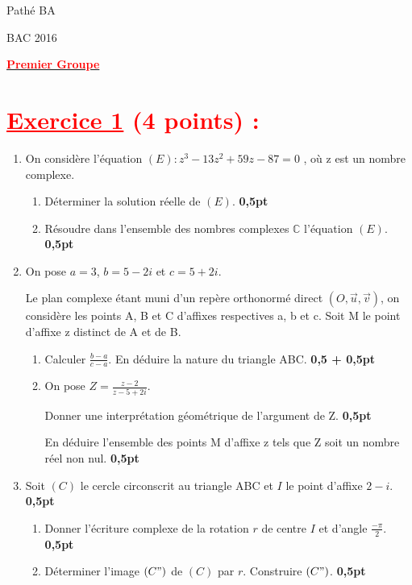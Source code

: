 \documentclass[12pt]{article}
\begin{document}
\begin{minipage}{0.8\textwidth}
	Pathé BA                          
\end{minipage}
\begin{minipage}{0.8\textwidth}
	BAC 2016
\end{minipage}

\begin{center}
\textbf{{\underline{\textcolor{red}{Premier Groupe}}}}
\end{center}

\section*{\textcolor{red}{\underline{Exercice 1} (4 points) :}}
\begin{enumerate}
	\item On considère l’équation $(E): z^{3}-13z^{2}+59z-87=0$ , où z est un nombre complexe.
	\begin{enumerate}
		\item Déterminer la solution réelle de $(E)$.\textbf{ 0,5pt}
		\item Résoudre dans l’ensemble des nombres complexes $\mathbb{C}$ l’équation $(E)$.\textbf{ 0,5pt}
	\end{enumerate}
	\item On pose $a = 3$, $b = 5 - 2i$ et $c = 5 + 2i$.
	
			Le plan complexe étant muni d’un repère orthonormé direct $( O, \vec{u} ,\vec{v} )$, on considère les points A, B et C d’affixes respectives a, b et c. Soit M le point d’affixe z distinct de A et de B.
	\begin{enumerate}
		\item Calculer $\frac{b-a}{c-a}$. En déduire la nature du triangle ABC. \textbf{ 0,5 + 0,5pt}
		\item On pose $Z=\frac{z-2}{z-5+2i}.$
		
		Donner une interprétation géométrique de l’argument de Z.\textbf{ 0,5pt}
		
		En déduire l’ensemble des points M d’affixe z tels que Z soit un nombre réel non nul.\textbf{ 0,5pt}
  \end{enumerate}
   \item Soit $(C)$ le cercle circonscrit au triangle ABC et $I$ le point d’affixe $2 - i$.\textbf{ 0,5pt}
   \begin{enumerate}
     \item Donner l’écriture complexe de la rotation $r$ de centre $I$ et d’angle $\frac{-\pi}{2}$.\textbf{ 0,5pt}
     \item Déterminer l’image $(C")$ de $(C)$ par $r$. Construire $(C")$.\textbf{ 0,5pt}
   \end{enumerate}
\end{enumerate}
\end{document}
